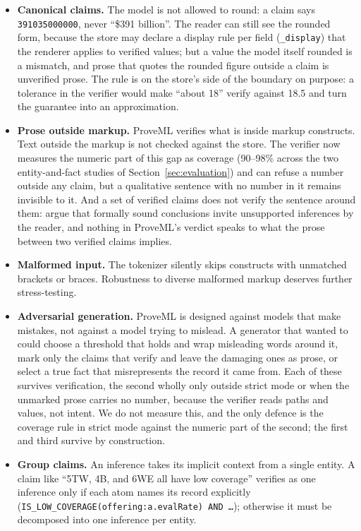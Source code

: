 \documentclass[11pt,a4paper]{article}
\begin{document}
\begin{itemize}[nosep]
    \item \textbf{Canonical claims.} The model is not allowed to round: a claim says \texttt{391035000000}, never ``\$391 billion''. The reader can still see the rounded form, because the store may declare a display rule per field (\texttt{\_display}) that the renderer applies to verified values; but a value the model itself rounded is a mismatch, and prose that quotes the rounded figure outside a claim is unverified prose. The rule is on the store's side of the boundary on purpose: a tolerance in the verifier would make ``about 18'' verify against 18.5 and turn the guarantee into an approximation.
    \item \textbf{Prose outside markup.} ProveML verifies what is inside markup constructs. Text outside the markup is not checked against the store. The verifier now measures the numeric part of this gap as coverage (90--98\% across the two entity-and-fact studies of Section~\ref{sec:evaluation}) and can refuse a number outside any claim, but a qualitative sentence with no number in it remains invisible to it. And a set of verified claims does not verify the sentence around them: \citet{chan2026soundness} argue that formally sound conclusions invite unsupported inferences by the reader, and nothing in ProveML's verdict speaks to what the prose between two verified claims implies.
    \item \textbf{Malformed input.} The tokenizer silently skips constructs with unmatched brackets or braces. Robustness to diverse malformed markup deserves further stress-testing.
    \item \textbf{Adversarial generation.} ProveML is designed against models that make mistakes, not against a model trying to mislead. A generator that wanted to could choose a threshold that holds and wrap misleading words around it, mark only the claims that verify and leave the damaging ones as prose, or select a true fact that misrepresents the record it came from. Each of these survives verification, the second wholly only outside strict mode or when the unmarked prose carries no number, because the verifier reads paths and values, not intent. We do not measure this, and the only defence is the coverage rule in strict mode against the numeric part of the second; the first and third survive by construction.
    \item \textbf{Group claims.} An inference takes its implicit context from a single entity. A claim like ``5TW, 4B, and 6WE all have low coverage'' verifies as one inference only if each atom names its record explicitly (\texttt{IS\_LOW\_COVERAGE(offering:a.evalRate) AND \ldots}); otherwise it must be decomposed into one inference per entity.
\end{itemize}
\end{document}
